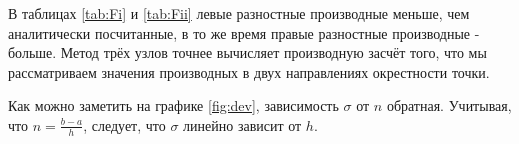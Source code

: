 \documentclass{article}
\begin{document}
В таблицах \ref{tab:Fi} и \ref{tab:Fii} левые разностные производные меньше,
чем аналитически посчитанные, в то же время правые разностные производные - больше.
Метод трёх узлов точнее вычисляет производную засчёт того, что мы рассматриваем
значения производных в двух направлениях окрестности точки.

Как можно заметить на графике \ref{fig:dev}, зависимость $\sigma$ от $n$ обратная.
Учитывая, что $n = \frac{b-a}{h}$, следует, что $\sigma$ линейно зависит от $h$.
\end{document}
